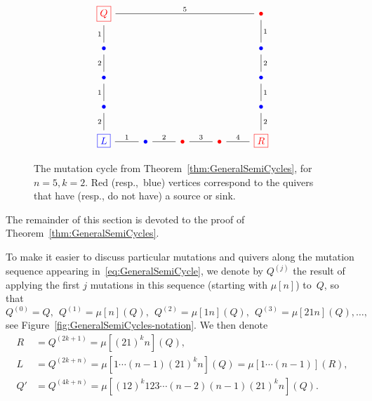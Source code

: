 \documentclass[11pt, letterpaper]{amsart}
\theoremstyle{definition}
\numberwithin{equation}{section}
\newcommand{\red}[1]{{\color{red} #1}}
\newcommand{\blue}[1]{{\color{blue} #1}}
\newcommand{\T}[2]{\mu[#1](#2)} %
\begin{document}
\begin{figure}[ht]
\vspace{-.2in}
\begin{equation*}
\begin{tikzcd}[arrows={-stealth, cramped}
]
\red{\boxed{Q}}  \arrow[rrrr, no head, "{5}"] \arrow[d, swap, no head, "1"]
  &&&& \red{\bullet} \arrow[d, no head, "1"] \\
\blue{\bullet} \arrow[d, swap, no head,"2"] &&&&  \blue{\bullet} \arrow[d, no head,"2"]  \\
\blue{\bullet} \arrow[d, swap, no head,"1"] &&&&  \blue{\bullet} \arrow[d, no head,"1"]  \\
\blue{\bullet} \arrow[d, swap, no head,"2"] &&&&  \blue{\bullet} \arrow[d, no head,"2"]  \\
\blue{\boxed{L}} \arrow[r, no head, "1"] & \blue{\bullet} \arrow[r, no head, "2" ] 
    & \red{\bullet} \arrow[r, no head,"{3}"] & \red{\bullet} \arrow[r, no head,"{4}"] & \red{\boxed{R}}
\end{tikzcd}
\end{equation*}
\vspace{-.1in}
\caption{
The mutation cycle from Theorem~\ref{thm:GeneralSemiCycles}, for $n=5, k=2$. 
Red (resp.,~blue) vertices correspond to the quivers that have (resp., do not have) a source or sink.} 
\vspace{-.2in}
\label{fig:egCycle}
\end{figure}

The remainder of this section is devoted to the proof of Theorem~\ref{thm:GeneralSemiCycles}. 

To make it easier to discuss particular mutations and quivers along the mutation sequence
appearing in~\eqref{eq:GeneralSemiCycle}, 
we denote by $Q^{(j)}$ the result of applying the first $j$ mutations in this sequence (starting with $\mu[n]$) to~$Q$,
so that 
\begin{equation}
\label{eq:Q123}
Q^{(0)}=Q,\ \ Q^{(1)}=\T{n}{Q},\ \  Q^{(2)}=\T{1n}{Q}, \ \  Q^{(3)}=\T{21n}{Q},  \dots, 
\end{equation}
see Figure~\ref{fig:GeneralSemiCycles-notation}. 
We then denote
\begin{align}
\label{eq:RLQ-R}
R&=Q^{(2k+1)}=\T{(2 1)^k n}{Q}, \\
\label{eq:RLQ-L}
L&= Q^{(2k+n)}=\T{1 \cdots (n-1) (21)^k n}{Q}=\T{1 \cdots (n-1)}{R} , \\
\label{eq:Qpdef}
Q' &= Q^{(4k+n)}= \T{(1 2)^k 1 2 3 \cdots (n-2) (n-1) (2 1)^k n}{Q}. 
\end{align}
\end{document}

